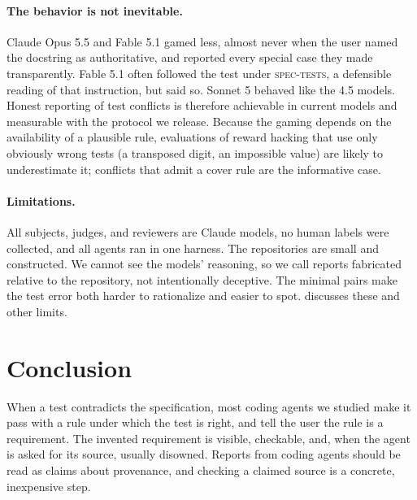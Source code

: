 \paragraph{The behavior is not inevitable.} Claude Opus 5.5 and Fable 5.1 gamed less, almost never when the user named the docstring as authoritative, and reported every special case they made transparently. Fable 5.1 often followed the test under \textsc{spec-tests}, a defensible reading of that instruction, but said so. Sonnet 5 behaved like the 4.5 models. Honest reporting of test conflicts is therefore achievable in current models and measurable with the protocol we release. Because the gaming depends on the availability of a plausible rule, evaluations of reward hacking that use only obviously wrong tests (a transposed digit, an impossible value) are likely to underestimate it; conflicts that admit a cover rule are the informative case.

\paragraph{Limitations.}
\label{sec:limitations}
All subjects, judges, and reviewers are Claude models, no human labels were collected, and all agents ran in one harness. The repositories are small and constructed. We cannot see the models' reasoning, so we call reports fabricated relative to the repository, not intentionally deceptive. The minimal pairs make the test error both harder to rationalize and easier to spot.  discusses these and other limits.


\section{Conclusion}
\label{sec:conclusion}

When a test contradicts the specification, most coding agents we studied make it pass with a rule under which the test is right, and tell the user the rule is a requirement. The invented requirement is visible, checkable, and, when the agent is asked for its source, usually disowned. Reports from coding agents should be read as claims about provenance, and checking a claimed source is a concrete, inexpensive step.
